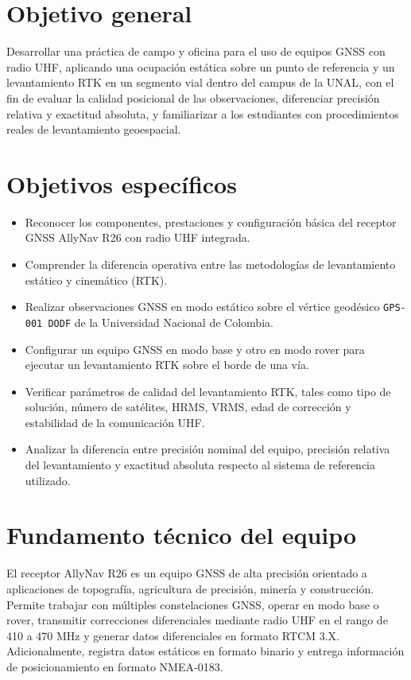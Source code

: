 \documentclass[
  letterpaper,
  DIV=11,
  numbers=noendperiod]{scrartcl}
\providecommand{\tightlist}{%
  \setlength{\itemsep}{0pt}\setlength{\parskip}{0pt}}\usepackage{longtable,booktabs,array}
\begin{document}
\section{Objetivo general}\label{objetivo-general}

Desarrollar una práctica de campo y oficina para el uso de equipos GNSS
con radio UHF, aplicando una ocupación estática sobre un punto de
referencia y un levantamiento RTK en un segmento vial dentro del campus
de la UNAL, con el fin de evaluar la calidad posicional de las
observaciones, diferenciar precisión relativa y exactitud absoluta, y
familiarizar a los estudiantes con procedimientos reales de
levantamiento geoespacial.

\section{Objetivos específicos}\label{objetivos-especuxedficos}

\begin{itemize}
\tightlist
\item
  Reconocer los componentes, prestaciones y configuración básica del
  receptor GNSS AllyNav R26 con radio UHF integrada.
\item
  Comprender la diferencia operativa entre las metodologías de
  levantamiento estático y cinemático (RTK).
\item
  Realizar observaciones GNSS en modo estático sobre el vértice
  geodésico \texttt{GPS-001\ DODF} de la Universidad Nacional de
  Colombia.
\item
  Configurar un equipo GNSS en modo base y otro en modo rover para
  ejecutar un levantamiento RTK sobre el borde de una vía.
\item
  Verificar parámetros de calidad del levantamiento RTK, tales como tipo
  de solución, número de satélites, HRMS, VRMS, edad de corrección y
  estabilidad de la comunicación UHF.
\item
  Analizar la diferencia entre precisión nominal del equipo, precisión
  relativa del levantamiento y exactitud absoluta respecto al sistema de
  referencia utilizado.
\end{itemize}

\section{Fundamento técnico del
equipo}\label{fundamento-tuxe9cnico-del-equipo}

El receptor AllyNav R26 es un equipo GNSS de alta precisión orientado a
aplicaciones de topografía, agricultura de precisión, minería y
construcción. Permite trabajar con múltiples constelaciones GNSS, operar
en modo base o rover, transmitir correcciones diferenciales mediante
radio UHF en el rango de 410 a 470 MHz y generar datos diferenciales en
formato RTCM 3.X. Adicionalmente, registra datos estáticos en formato
binario y entrega información de posicionamiento en formato NMEA-0183.
\end{document}
